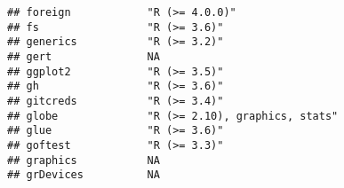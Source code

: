 \documentclass[
]{article}
\begin{document}
\begin{verbatim}
## foreign            "R (>= 4.0.0)"                                                                                                                                                                                        
## fs                 "R (>= 3.6)"                                                                                                                                                                                          
## generics           "R (>= 3.2)"                                                                                                                                                                                          
## gert               NA                                                                                                                                                                                                    
## ggplot2            "R (>= 3.5)"                                                                                                                                                                                          
## gh                 "R (>= 3.6)"                                                                                                                                                                                          
## gitcreds           "R (>= 3.4)"                                                                                                                                                                                          
## globe              "R (>= 2.10), graphics, stats"                                                                                                                                                                        
## glue               "R (>= 3.6)"                                                                                                                                                                                          
## goftest            "R (>= 3.3)"                                                                                                                                                                                          
## graphics           NA                                                                                                                                                                                                    
## grDevices          NA                                                                                                                                                                                                    

\end{verbatim}
\end{document}
